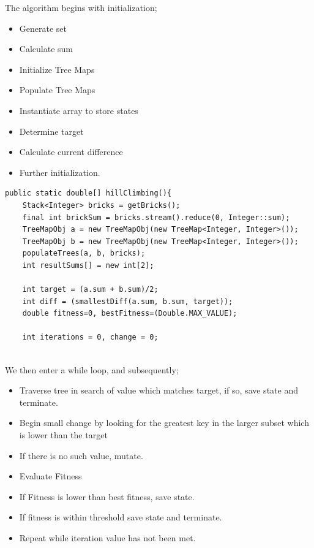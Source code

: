\documentclass[a4paper]{article}
\begin{document}
\newpage

The algorithm begins with initialization; \\
\begin{itemize}
  \item Generate set
  \item Calculate sum
  \item Initialize Tree Maps
  \item Populate Tree Maps
  \item Instantiate array to store states
  \item Determine target 
  \item Calculate current difference 
  \item Further initialization.
\end{itemize} 
\vspace{8mm}

\begin{verbatim}
public static double[] hillClimbing(){
    Stack<Integer> bricks = getBricks();
    final int brickSum = bricks.stream().reduce(0, Integer::sum);
    TreeMapObj a = new TreeMapObj(new TreeMap<Integer, Integer>());
    TreeMapObj b = new TreeMapObj(new TreeMap<Integer, Integer>());
    populateTrees(a, b, bricks);
    int resultSums[] = new int[2];
  
    int target = (a.sum + b.sum)/2;
    int diff = (smallestDiff(a.sum, b.sum, target));
    double fitness=0, bestFitness=(Double.MAX_VALUE);

    int iterations = 0, change = 0;
    

\end{verbatim}


\newpage

\vspace*{-1cm} 
We then enter a while loop, and subsequently;
\vspace{2mm}
\begin{itemize}
  \item Traverse tree in search of value which matches target,
    if so, save state and terminate.
  \item Begin small change by looking for the greatest key in the larger subset 
    which is lower than the target  
  \item If there is no such value, mutate.
  \item Evaluate Fitness
  \item If Fitness is lower than best fitness, save state.
  \item If fitness is within threshold save state and terminate.
  \item Repeat while iteration value has not been met.
  
\end{itemize}
\end{document}
